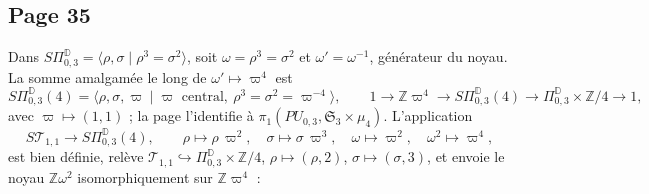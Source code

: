 \documentclass[11pt,a4paper]{article}
\begin{document}
\subsection*{Page 35}

Dans $S\Pi^{\mathbb{D}}_{0,3} = \langle \rho, \sigma \mid \rho^3 = \sigma^2 \rangle$,
soit $\omega = \rho^3 = \sigma^2$ et $\omega' = \omega^{-1}$, générateur du noyau.
La somme amalgamée le long de $\omega' \mapsto \varpi^4$ est
\[
S\Pi^{\mathbb{D}}_{0,3}(4) = \langle \rho, \sigma, \varpi \mid \varpi
\text{ central},\ \rho^3 = \sigma^2 = \varpi^{-4} \rangle ,
\qquad
1 \to \mathbb{Z}\varpi^4 \to S\Pi^{\mathbb{D}}_{0,3}(4) \to
\Pi^{\mathbb{D}}_{0,3} \times \mathbb{Z}/4 \to 1 ,
\]
avec $\varpi \mapsto (1, 1)$ ; la page l'identifie à
$\pi_1(PU_{0,3}, \mathfrak{S}_3 \times \mu_4)$. L'application
\[
S\mathcal{T}_{1,1} \longrightarrow S\Pi^{\mathbb{D}}_{0,3}(4), \qquad
\rho \mapsto \rho\,\varpi^2, \quad \sigma \mapsto \sigma\,\varpi^3, \quad
\omega \mapsto \varpi^2, \quad \omega^2 \mapsto \varpi^4 ,
\]
est bien définie, relève $\mathcal{T}_{1,1} \hookrightarrow \Pi^{\mathbb{D}}_{0,3}
\times \mathbb{Z}/4$, $\rho \mapsto (\rho, 2)$, $\sigma \mapsto (\sigma, 3)$, et
envoie le noyau $\mathbb{Z}\omega^2$ isomorphiquement sur $\mathbb{Z}\varpi^4$ :

\end{document}

